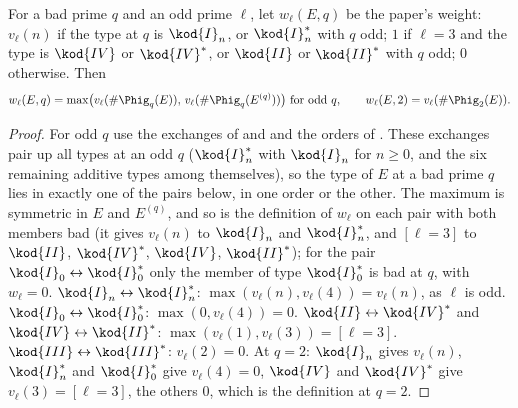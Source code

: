 \begin{proposition}\label{prop:reduction:twist-weight}
For a bad prime $q$ and an odd prime $\ell$, let $w_\ell(E,q)$ be the paper's weight: $v_\ell(n)$ if the type at $q$ is $\kod{I}_n$, or
$\kod{I}_n^*$ with $q$ odd; $1$ if $\ell=3$ and the type is $\kod{IV}$ or $\kod{IV}^*$, or $\kod{II}$ or $\kod{II}^*$ with $q$ odd; $0$ otherwise.
Then
\[
w_\ell(E,q)=\max\bigl(v_\ell(\#\Phig_q(E)),\,v_\ell(\#\Phig_q(E^{(q)}))\bigr)\ \text{for odd }q,\qquad w_\ell(E,2)=v_\ell(\#\Phig_2(E)).
\]
\end{proposition}

\begin{proof}
For odd $q$ use the exchanges of  and  and the orders of
. These exchanges pair up all types at an odd $q$ ($\kod{I}_n^*$ with $\kod{I}_n$ for $n\ge0$, and the six remaining
additive types among themselves), so the type of $E$ at a bad prime $q$ lies in exactly one of the pairs below, in one order or the
other. The maximum is symmetric in $E$ and $E^{(q)}$, and so is the definition of $w_\ell$ on each pair with both members bad (it
gives $v_\ell(n)$ to $\kod{I}_n$ and $\kod{I}_n^*$, and $[\ell=3]$ to $\kod{II}$, $\kod{IV}^*$, $\kod{IV}$, $\kod{II}^*$); for the pair
$\kod{I}_0\leftrightarrow\kod{I}_0^*$ only the member of type $\kod{I}_0^*$ is bad at $q$, with $w_\ell=0$. $\kod{I}_n\leftrightarrow\kod{I}_n^*$: $\max(v_\ell(n),v_\ell(4))=v_\ell(n)$, as $\ell$ is odd.
$\kod{I}_0\leftrightarrow\kod{I}_0^*$: $\max(0,v_\ell(4))=0$. $\kod{II}\leftrightarrow\kod{IV}^*$ and $\kod{IV}\leftrightarrow\kod{II}^*$:
$\max(v_\ell(1),v_\ell(3))=[\ell=3]$. $\kod{III}\leftrightarrow\kod{III}^*$: $v_\ell(2)=0$. At $q=2$: $\kod{I}_n$ gives $v_\ell(n)$,
$\kod{I}_n^*$ and $\kod{I}_0^*$ give $v_\ell(4)=0$, $\kod{IV}$ and $\kod{IV}^*$ give $v_\ell(3)=[\ell=3]$, the others $0$, which is the definition at
$q=2$.
\end{proof}

